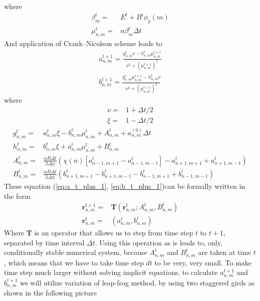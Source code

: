 \documentclass[40pt,letterpaper,physrev]{article}
\begin{document}
	where 
	\begin{align}
	\beta^t_m=&E^t+B^t\phi_y(m) \\
	\mu^t_{n,m}=&n\beta^t_{m}\Delta t
	\end{align}
	And application of Crank–Nicolson scheme leads to
	\begin{align}
	a^{t+1}_{n,m}=\frac{g^t_{n,m}\nu-h^t_{n,m}\mu^{t+1}_{n,m}}{\nu^2+\left(\mu^{t+1}_{n,m}\right)^2}\label{eq:a_t_plus_1}\\
	b^{t+1}_{n,m}=\frac{g^t_{n,m}\mu^{t+1}_{n,m}-h^t_{n,m}\nu}{\nu^2+\left(\mu^{t+1}_{n,m}\right)^2}\label{eq:b_t_plus_1}
	\end{align}
	where 
	\begin{align}
	\nu=&1+\Delta t/2 \\
	\xi=&1-\Delta t/2 
	\end{align}
	\begin{align}
	g^t_{n,m}=&a^t_{n,m}\xi-
		b^t_{n,m}\mu^t_{n,m}+A^t_{n,m}+a^{(0)}_{n,m}\Delta t \\
	h^t_{n,m}=&b^t_{n,m}\xi+a^t_{n,m}\mu^t_{n,m}+
		B^t_{n,m} \\
	A^t_{n,m}=&\frac{\alpha B\Delta t}{2\Delta\phi}(\chi(n)[a^t_{n-1,m+1}-a^t_{n-1,m-1}]-a^t_{n+1,m+1}+a^t_{n+1,m-1}) \\
	B^t_{n,m}=&\frac{\alpha B\Delta t}{2\Delta\phi}(b^t_{n+1,m+1}-b^t_{n+1,m-1}-
		b^t_{n-1,m+1}+b^t_{n-1,m-1})
	\end{align}
	These equation (\ref{eq:a_t_plus_1}, \ref{eq:b_t_plus_1})can be formally written in the form
	\begin{align}
		\mathbf{r}^{t+1}_{n,m}=&\mathbf{T}(\mathbf{r}^t_{n,m};A^t_{n,m},B^t_{n,m}) \label{eq:time_shift} \\
		\mathbf{r}^{t}_{n,m}=&(a^t_{n,m}, b^t_{n,m})
	\end{align}
	Where $\mathbf{T}$ is an operator that allows us to step from time step $t$ to $t+1$, separated by time interval $\Delta t$. 
	Using this operation as is leads to, only, conditionally stable numerical system, because $A^t_{n,m}$ and $B^t_{n,m}$ are 
	taken at time $t$, which means that we have to take time step $dt$ to be very, very small. To make time step much larger 
	without solving implicit equations, to calculate $a^{t+1}_{n,m}$ and $b^{t+1}_{n,m}$ we will utilize variation of leap-frog 
	method, by using two staggered girds as shown in the following picture
	
\end{document}

